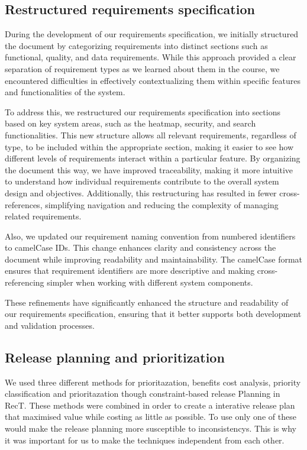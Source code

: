 \subsection{Restructured requirements specification}
During the development of our requirements specification, we initially structured the document by categorizing requirements into distinct sections such as functional, quality, and data requirements. While this approach provided a clear separation of requirement types as we learned about them in the course, we encountered difficulties in effectively contextualizing them within specific features and functionalities of the system.

To address this, we restructured our requirements specification into sections based on key system areas, such as the heatmap, security, and search functionalities. This new structure allows all relevant requirements, regardless of type, to be included within the appropriate section, making it easier to see how different levels of requirements interact within a particular feature. By organizing the document this way, we have improved traceability, making it more intuitive to understand how individual requirements contribute to the overall system design and objectives. Additionally, this restructuring has resulted in fewer cross-references, simplifying navigation and reducing the complexity of managing related requirements.

Also, we updated our requirement naming convention from numbered identifiers to camelCase IDs. This change enhances clarity and consistency across the document while improving readability and maintainability. The camelCase format ensures that requirement identifiers are more descriptive and making cross-referencing simpler when working with different system components.

These refinements have significantly enhanced the structure and readability of our requirements specification, ensuring that it better supports both development and validation processes.

\subsection{Release planning and prioritization}

We used three different methods for prioritazation, benefits cost analysis, priority classification and prioritazation though constraint-based release Planning in RecT. These methods were combined in order to create a interative release plan that maximised value while costing as little as possible. To use only one of these would make the release planning more susceptible to inconsistencys. This is why it was important for us to make the techniques independent from each other.

